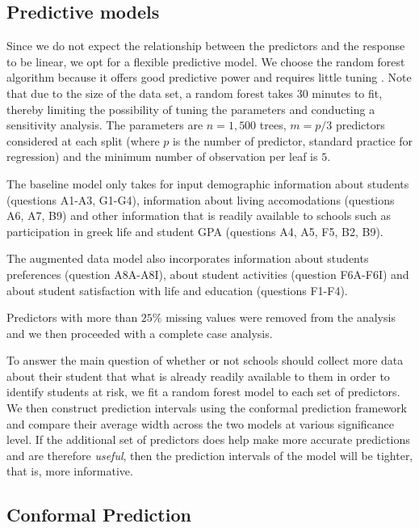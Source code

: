 \documentclass[10pt]{amsart}%
\begin{document}
\subsection{Predictive models}

Since we do not expect the relationship between the predictors and the response to be linear, we opt for a flexible predictive model. We choose the random forest algorithm because it offers good predictive power and requires little tuning . Note that due to the size of the data set, a random forest takes 30 minutes to fit, thereby limiting the possibility of tuning the parameters and conducting a sensitivity analysis. The parameters are $n=1,500$ trees, $m=p/3$ predictors considered at each split (where $p$ is the number of predictor, standard practice for regression) and the minimum number of observation per leaf is $5$.

The baseline model only takes for input demographic information about students (questions A1-A3, G1-G4), information about living accomodations (questions A6, A7, B9) and other information that is readily available to schools such as participation in greek life and student GPA (questions A4, A5, F5, B2, B9).

The augmented data model also incorporates information about students preferences (question A8A-A8I), about student activities (question F6A-F6I) and about student satisfaction with life and education (questions F1-F4).

Predictors with more than $25\%$ missing values were removed from the analysis and we then proceeded with a complete case analysis.

To answer the main question of whether or not schools should collect more data about their student that what is already readily available to them in order to identify students at risk, we fit a random forest model to each set of predictors. We then construct prediction intervals using the conformal prediction framework and compare their average width across the two models at various significance level. If the additional set of predictors does help make more accurate predictions and are therefore \textit{useful}, then the prediction intervals of the model will be tighter, that is, more informative.

\subsection{Conformal Prediction}
\end{document}

